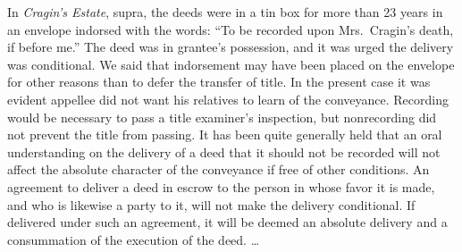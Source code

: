 In \textit{Cragin's Estate}, supra, the deeds were in a tin box for more than 23
years in an envelope indorsed with the words: ``To be recorded upon
Mrs.~Cragin's death, if before me.'' The deed was in grantee's possession, and
it was
urged the delivery was conditional. We said that indorsement may have been
placed on the envelope for other reasons than to defer the transfer of title.
In the present case it was evident appellee did not want his relatives to learn
of the conveyance. Recording would be necessary to pass a title examiner's
inspection, but nonrecording did not prevent the title from passing. It has
been quite generally held that an oral understanding on the delivery of a deed
that it should not be recorded will not affect the absolute character of the
conveyance if free of other conditions. An agreement to deliver a deed in escrow
to the person in whose favor it is made, and who is likewise a party to it,
will not make the delivery conditional. If delivered under such an agreement,
it will be deemed an absolute delivery and a consummation of the execution of
the deed. \dots{}

